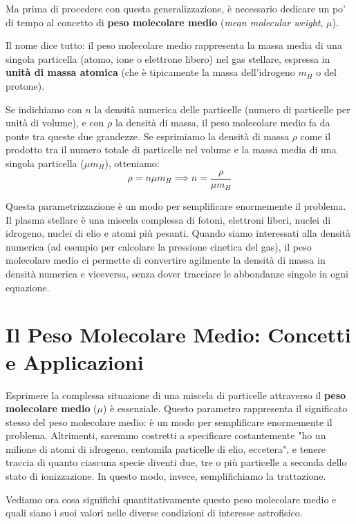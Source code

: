 Ma prima di procedere con questa generalizzazione, è necessario dedicare un po' di tempo al concetto di \textbf{peso molecolare medio} (\textit{mean molecular weight}, $\mu$).

Il nome dice tutto: il peso molecolare medio rappresenta la massa media di una singola particella (atomo, ione o elettrone libero) nel gas stellare, espressa in \textbf{unità di massa atomica} (che è tipicamente la massa dell'idrogeno $m_H$ o del protone).

Se indichiamo con $n$ la densità numerica delle particelle (numero di particelle per unità di volume), e con $\rho$ la densità di massa, il peso molecolare medio fa da ponte tra queste due grandezze. Se esprimiamo la densità di massa $\rho$ come il prodotto tra il numero totale di particelle nel volume e la massa media di una singola particella ($\mu m_H$), otteniamo:
\begin{equation}
\rho = n \mu m_H \implies n = \frac{\rho}{\mu m_H}
\end{equation}

Questa parametrizzazione è un modo per semplificare enormemente il problema. Il plasma stellare è una miscela complessa di fotoni, elettroni liberi, nuclei di idrogeno, nuclei di elio e atomi più pesanti. Quando siamo interessati alla densità numerica (ad esempio per calcolare la pressione cinetica del gas), il peso molecolare medio ci permette di convertire agilmente la densità di massa in densità numerica e viceversa, senza dover tracciare le abbondanze singole in ogni equazione.

\section{Il Peso Molecolare Medio: Concetti e Applicazioni}

Esprimere la complessa situazione di una miscela di particelle attraverso il \textbf{peso molecolare medio} ($\mu$) è essenziale. Questo parametro rappresenta il significato stesso del peso molecolare medio: è un modo per semplificare enormemente il problema. Altrimenti, saremmo costretti a specificare costantemente "ho un milione di atomi di idrogeno, centomila particelle di elio, eccetera", e tenere traccia di quanto ciascuna specie diventi due, tre o più particelle a seconda dello stato di ionizzazione. In questo modo, invece, semplifichiamo la trattazione.

Vediamo ora cosa significhi quantitativamente questo peso molecolare medio e quali siano i suoi valori nelle diverse condizioni di interesse astrofisico.

